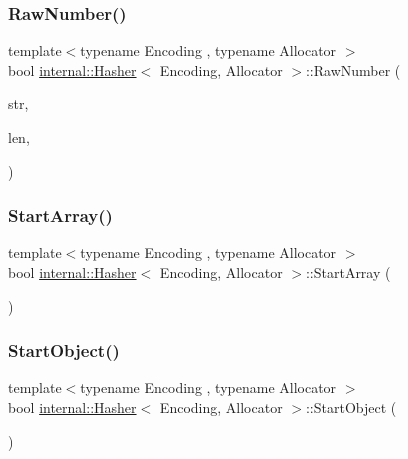 \subsubsection{\texorpdfstring{Raw\+Number()}{RawNumber()}}
{\footnotesize\ttfamily template$<$typename Encoding , typename Allocator $>$ \\
bool \hyperlink{classinternal_1_1Hasher}{internal\+::\+Hasher}$<$ Encoding, Allocator $>$\+::Raw\+Number (\begin{DoxyParamCaption}\item[{const \hyperlink{classinternal_1_1Hasher_a415970af68a067615c3c95306cff6d43}{Ch} $\ast$}]{str,  }\item[{\hyperlink{rapidjson_8h_a5ed6e6e67250fadbd041127e6386dcb5}{Size\+Type}}]{len,  }\item[{bool}]{ }\end{DoxyParamCaption})\hspace{0.3cm}{\ttfamily [inline]}}

\mbox{\label{classinternal_1_1Hasher_a2ceb3cc00216f6b6ce66907856a16404}} 
\subsubsection{\texorpdfstring{Start\+Array()}{StartArray()}}
{\footnotesize\ttfamily template$<$typename Encoding , typename Allocator $>$ \\
bool \hyperlink{classinternal_1_1Hasher}{internal\+::\+Hasher}$<$ Encoding, Allocator $>$\+::Start\+Array (\begin{DoxyParamCaption}{ }\end{DoxyParamCaption})\hspace{0.3cm}{\ttfamily [inline]}}

\mbox{\label{classinternal_1_1Hasher_a1607d6cac3daab9725e442e38d121028}} 
\subsubsection{\texorpdfstring{Start\+Object()}{StartObject()}}
{\footnotesize\ttfamily template$<$typename Encoding , typename Allocator $>$ \\
bool \hyperlink{classinternal_1_1Hasher}{internal\+::\+Hasher}$<$ Encoding, Allocator $>$\+::Start\+Object (\begin{DoxyParamCaption}{ }\end{DoxyParamCaption})\hspace{0.3cm}{\ttfamily [inline]}}

